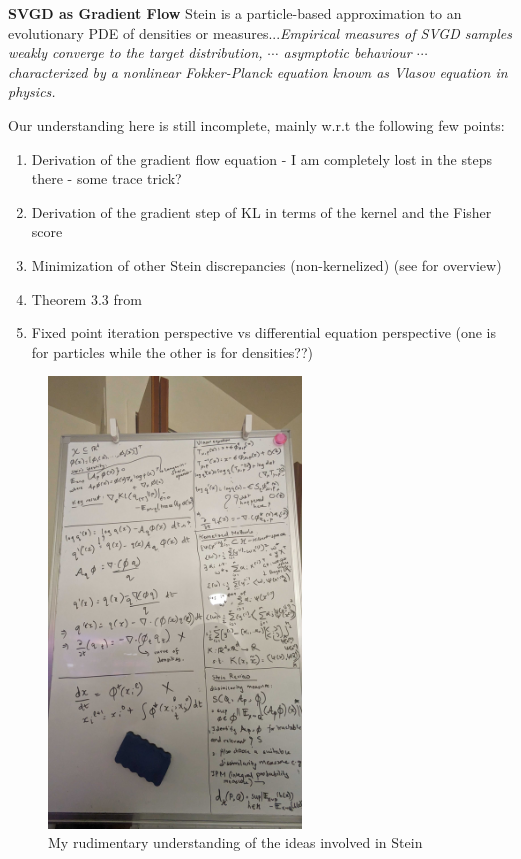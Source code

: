 \documentclass[12pt]{article}
\renewcommand{\[}{\left[}
\renewcommand{\]}{\right]}
\renewcommand{\(}{\left(}
\renewcommand{\)}{\right)}
\begin{document}
\noindent \textbf{SVGD as Gradient Flow} Stein is a particle-based approximation to an evolutionary PDE of densities or measures...\emph{Empirical measures of SVGD samples weakly converge to the target distribution, $\cdots$ asymptotic behaviour $\cdots$ characterized by a nonlinear Fokker-Planck equation known as Vlasov equation in physics.} \cite{liu_stein_2017}

Our understanding here is still incomplete, mainly w.r.t the following few points:

\begin{enumerate}
    \item Derivation of the gradient flow equation - I am completely lost in the steps there - some trace trick?

    \item Derivation of the gradient step of KL in terms of the kernel and the Fisher score

    \item Minimization of other Stein discrepancies (non-kernelized) (see \cite{anastasiou_steins_2023} for overview)

    \item Theorem 3.3 from \cite{liu_stein_2017}

    \item Fixed point iteration perspective vs differential equation perspective (one is for particles while the other is for densities??)
\end{enumerate}

\begin{figure}[H]
    \centering
    \includegraphics[width=0.6\textwidth]{figures/stein_overview.jpg}
    \caption{My rudimentary understanding of the ideas involved in Stein}
    \label{fig:stein-big-picture}
\end{figure}
\end{document}
